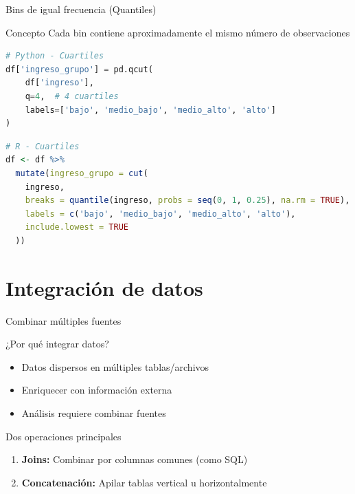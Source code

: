 \documentclass[aspectratio=169]{beamer}
\begin{document}
\begin{frame}[fragile]{Bins de igual frecuencia (Quantiles)}
\begin{block}{Concepto}
Cada bin contiene aproximadamente el mismo número de observaciones
\end{block}

\begin{lstlisting}[language=Python]
# Python - Cuartiles
df['ingreso_grupo'] = pd.qcut(
    df['ingreso'],
    q=4,  # 4 cuartiles
    labels=['bajo', 'medio_bajo', 'medio_alto', 'alto']
)
\end{lstlisting}

\begin{lstlisting}[language=R]
# R - Cuartiles
df <- df %>%
  mutate(ingreso_grupo = cut(
    ingreso,
    breaks = quantile(ingreso, probs = seq(0, 1, 0.25), na.rm = TRUE),
    labels = c('bajo', 'medio_bajo', 'medio_alto', 'alto'),
    include.lowest = TRUE
  ))
\end{lstlisting}
\end{frame}

\section{Integración de datos}

\begin{frame}{Combinar múltiples fuentes}
\begin{block}{¿Por qué integrar datos?}
\begin{itemize}
    \item Datos dispersos en múltiples tablas/archivos
    \item Enriquecer con información externa
    \item Análisis requiere combinar fuentes
\end{itemize}
\end{block}

\pause

\begin{block}{Dos operaciones principales}
\begin{enumerate}
    \item \textbf{Joins:} Combinar por columnas comunes (como SQL)
    \item \textbf{Concatenación:} Apilar tablas vertical u horizontalmente
\end{enumerate}
\end{block}
\end{frame}
\end{document}
